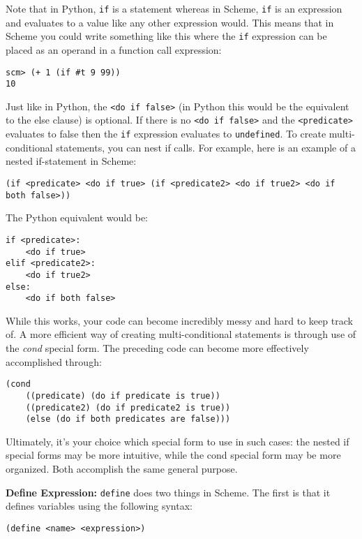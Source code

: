 Note that in Python, \lstinline{if} is a statement whereas in Scheme, \lstinline{if} is an expression and evaluates to a value like any other expression would. This means that in Scheme you could write something like this where the \lstinline{if} expression can be placed as an operand in a function call expression:
\begin{lstlisting}
scm> (+ 1 (if #t 9 99))
10
\end{lstlisting}

Just like in Python, the \lstinline{<do if false>} (in Python this would be the equivalent to the else clause) is optional. If there is no \lstinline{<do if false>} and the \lstinline{<predicate>} evaluates to false then the \lstinline{if} expression evaluates to \lstinline{undefined}.
To create multi-conditional statements, you can nest if calls. For example, here is an example of a nested if-statement in Scheme:
\begin{lstlisting}
(if <predicate> <do if true> (if <predicate2> <do if true2> <do if both false>))
\end{lstlisting}

The Python equivalent would be:
\begin{lstlisting}
if <predicate>:
    <do if true>
elif <predicate2>:
    <do if true2>
else:
    <do if both false>
\end{lstlisting}

While this works, your code can become incredibly messy and hard to keep track of. A more efficient way of creating multi-conditional statements is through use of the \textit{cond} special form.
The preceding code can become more effectively accomplished through:
\begin{lstlisting}
(cond
    ((predicate) (do if predicate is true))
    ((predicate2) (do if predicate2 is true))
    (else (do if both predicates are false)))
\end{lstlisting}

Ultimately, it's your choice which special form to use in such cases: the nested if special forms may be more intuitive, while the cond special form may be more organized. Both accomplish the same general purpose.

\vspace{4mm}

\textbf{Define Expression: }
\lstinline{define} does two things in Scheme. The first is that it defines variables using the following syntax:
\begin{lstlisting}
(define <name> <expression>)
\end{lstlisting}


